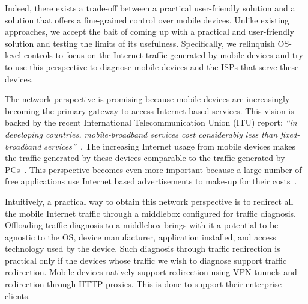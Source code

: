 Indeed, there exists a trade-off between a practical user-friendly solution and a solution that offers a fine-grained control over mobile devices. 
Unlike existing approaches, we accept the bait of coming up with a practical and user-friendly solution and testing the limits of its usefulness. 
Specifically, we relinquish OS-level controls to focus on the Internet traffic generated by mobile devices and try to use this perspective to diagnose mobile devices and the ISPs that serve these devices. 

The network perspective is promising because mobile devices are increasingly becoming the primary gateway to access Internet based services. 
This vision is backed by the recent International Telecommunication Union (ITU) report: \emph{``in developing countries, mobile-broadband services cost considerably less than fixed-broadband services''}~\cite{ict:facts}.
The increasing Internet usage from mobile devices makes the traffic generated by these devices comparable to the traffic generated by PCs~\cite{falaki:smartphoneusage}.
This perspective becomes even more important because a large number of free applications use Internet based advertisements to make-up for their costs~\cite{pathak:eprof,vallina-rodriguez:bfc}.

Intuitively, a practical way to obtain this network perspective is to redirect all the mobile Internet traffic through a middlebox configured for traffic diagnosis. 
Offloading traffic diagnosis to a middlebox brings with it a potential to be agnostic to the OS, device manufacturer, application installed, and access technology used by the device. 
Such diagnosis through traffic redirection is practical only if the devices whose traffic we wish to diagnose support traffic redirection. 
Mobile devices natively support redirection using VPN tunnels and redirection through HTTP proxies.
This is done to support their enterprise clients. 

